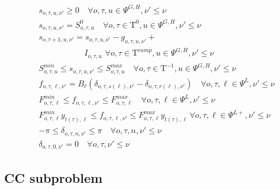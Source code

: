 \documentclass[final]{IEEEtran}
\newcommand{\Tau}{\mathrm{T}}
\begin{document}
\begin{align}
&s_{o, \tau, u, \nu'} \geq 0 \quad \forall o, \tau, u \in \Psi^{G, H}, \nu' \leq \nu \\
&s_{o, \tau, u, \nu'} = S^0_{o, \tau, u} \quad \forall o, \tau \in \Tau^0, u \in \Psi^{G, H}, \nu' \leq \nu \\
&s_{o, \tau + 1, u, \nu'} = s_{o, \tau, u, \nu'} - g_{o, \tau, u, \nu'} + \nonumber \\
&\quad \quad \quad \quad \quad \, \, \, I_{o, \tau, u} \, \, \forall o, \tau \in \Tau^{ramp}, u \in \Psi^{G, H}, \nu' \leq \nu \\
&S^{min}_{o, \tau, u} \leq s_{o, \tau, u, \nu'} \leq S^{max}_{o, \tau, u} \quad \forall o, \tau \in \Tau^{-1}, u \in \Psi^{G, H}, \nu' \leq \nu \\
&f_{o, \tau, \ell, \nu'} = B_\ell (\delta_{o, \tau, s(\ell), \nu'} - \delta_{o, \tau, r(\ell), \nu'}) \quad \forall o, \tau, \ell \in \Psi^L, \nu' \leq \nu \\
&\label{cc_master_constraint_benders1}F_{o, \tau, \ell}^{min} \leq f_{o, \tau, \ell, \nu'} \leq F_{o, \tau, \ell}^{max} \quad \forall o, \tau, \ell \in \Psi^L, \nu' \leq \nu \\
&F_{o, \tau, \ell}^{min} y_{t(\tau), \ell} \leq f_{o, \tau, \ell, \nu'} \leq F_{o, \tau, \ell}^{max} y_{t(\tau), \ell} \, \forall o, \tau, \ell \in \Psi^{L+}, \nu' \leq \nu \\
&\label{cc_master_constraint_benders2}-\pi \leq \delta_{o, \tau, n, \nu'} \leq \pi \quad \forall o, \tau, n, \nu' \leq \nu \\
&\label{cc_master_last} \delta_{o, \tau, 0, \nu'} = 0 \quad \forall o, \tau, \nu' \leq \nu
\end{align}

\subsection{CC subproblem}
\end{document}
